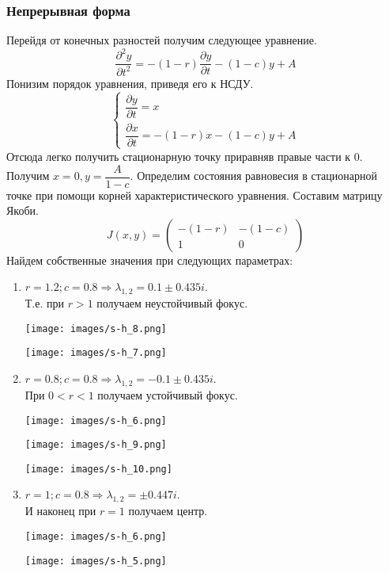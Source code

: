 \subsubsection{Непрерывная форма}
Перейдя от конечных разностей получим следующее уравнение.
\begin{equation}
  \dfrac{\partial^2y}{\partial t^2}=-(1-r)\dfrac{\partial y}{\partial t}-(1-c)y+A
\end{equation}
Понизим порядок уравнения, приведя его к НСДУ.
\begin{equation}
  \begin{cases}
    \dfrac{\partial y}{\partial t} = x\\
    \dfrac{\partial x}{\partial t} = -(1-r)x-(1-c)y+A
  \end{cases}
\end{equation}
Отсюда легко получить стационарную точку приравняв правые части к 0. Получим $x=0, y=\dfrac{A}{1-c}$.
Определим состояния равновесия в стационарной точке при помощи корней характеристического уравнения. Составим матрицу Якоби.
\begin{equation}
  J(x, y) = \begin{pmatrix}
    -(1-r)&-(1-c)\\1&0
  \end{pmatrix}
\end{equation}
Найдем собственные значения при следующих параметрах:
\begin{enumerate}
  \item $r=1.2;c=0.8\Rightarrow \lambda_{1,2}=0.1\pm 0.435 i$.\\ Т.е. при $r>1$ получаем неустойчивый фокус.
  \begin{center}
    \texttt{[image: images/s-h\_8.png]}
  \end{center}
  \begin{center}
    \texttt{[image: images/s-h\_7.png]}
  \end{center}
  \item $r=0.8;c=0.8\Rightarrow \lambda_{1,2}=-0.1\pm 0.435 i$.\\ При $0<r<1$ получаем устойчивый фокус.
  \begin{center}
    \texttt{[image: images/s-h\_6.png]}
  \end{center}
  \begin{center}
    \texttt{[image: images/s-h\_9.png]}
  \end{center}
  \begin{center}
    \texttt{[image: images/s-h\_10.png]}
  \end{center}
  \item $r=1;c=0.8\Rightarrow \lambda_{1,2}=\pm 0.447 i$.\\ И наконец при $r=1$ получаем центр.
  \begin{center}
    \texttt{[image: images/s-h\_6.png]}
  \end{center}
  \begin{center}
    \texttt{[image: images/s-h\_5.png]}
  \end{center}
\end{enumerate}


